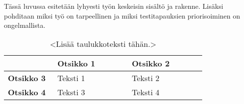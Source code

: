 Tässä luvussa esitetään lyhyesti työn keskeisin sisältö ja rakenne.
Lisäksi pohditaan miksi työ on tarpeellinen ja miksi testitapauksien priorisoiminen on ongelmallista.

\begin{table}[ht!]
  \centering
  \caption{<Lisää taulukkoteksti tähän.>}
  \label{tab:taulukkoesimerkki}
  \begin{tabular}{p{0.2\linewidth} | p{0.3\linewidth} | p{0.3\linewidth}}
    \hline
    & \textbf{Otsikko 1} & \textbf{Otsikko 2} \\
    \hline
    \textbf{Otsikko 3} & Teksti 1 & Teksti 2\\
    \hline
    \textbf{Otsikko 4} & Teksti 3 & Teksti 4\\
    \hline
  \end{tabular}
\end{table}

\parencite{nawar_multi-heuristic_2014}

\parencite{zhang_test_2007}